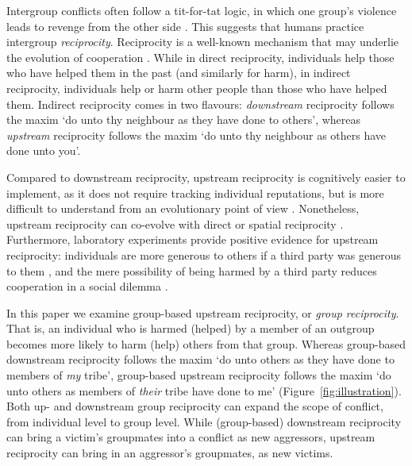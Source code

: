\documentclass[12pt,a4paper]{article}\usepackage[]{graphicx}\usepackage[]{color}
\begin{document}
Intergroup conflicts often follow a tit-for-tat logic, in which one group's
violence leads to revenge from the other side
\citep{horowitz2001thedeadly,horowitz1985ethnicgroups,chagnon1988lifehistories,haushofer_both_2010,shayo2010judicial}.
This suggests that humans practice intergroup \emph{reciprocity}. Reciprocity is
a well-known mechanism that may underlie the evolution of cooperation
\citep{nowak2006five,nowak2012evolving}. While in direct reciprocity,
individuals help those who have helped them in the past (and similarly for
harm), in indirect reciprocity, individuals help or harm other people than those
who have helped them.  Indirect reciprocity comes in two flavours:
\emph{downstream} reciprocity follows the maxim `do unto thy neighbour as they
have done to others', whereas \emph{upstream} reciprocity follows the maxim `do
unto thy neighbour as others have done unto you'. 

Compared to downstream reciprocity, upstream reciprocity is cognitively easier to
implement, as it does not require tracking individual reputations, but is more
difficult to understand from an evolutionary point of view
\citep{boyd1989evolution,nowak2005evolution}. Nonetheless, upstream reciprocity
can co-evolve with direct or spatial reciprocity \citep{nowak2007upstream}.
Furthermore, laboratory experiments provide positive evidence for upstream
reciprocity: individuals are more generous to others if a third party was
generous to them \citep{dufwenberg2001direct,guth2001trust,greiner2005indirect},
and the mere possibility of being harmed by a third party reduces cooperation in
a social dilemma \citep{weisel2016social}.

In this paper we examine
group-based upstream reciprocity, or \emph{group reciprocity}. That is, an
individual who is harmed (helped) by a member of an outgroup becomes more likely
to harm (help) others from that group.  Whereas group-based downstream
reciprocity \citep{bernhard2006group,bernhard2006parochial} follows the maxim
`do unto others as they have done to members of \emph{my} tribe', group-based
upstream reciprocity follows the maxim `do unto others as members of
\emph{their} tribe have done to me' (Figure~\ref{fig:illustration}).
%
Both up- and downstream group reciprocity can  expand the scope of conflict, 
from individual level to group level. While (group-based)
downstream reciprocity can bring a victim’s groupmates into a conflict 
as new aggressors, upstream reciprocity can bring in an aggressor’s groupmates, as new victims.
\end{document}

